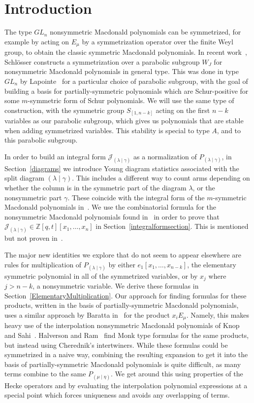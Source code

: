 \documentclass[11pt]{article}
\theoremstyle{definition}
\numberwithin{equation}{section}
\newcommand{\PP}{P_{(\lambda \mid \gamma)}}
\newcommand{\JJ}{\mathcal{J}_{(\lambda \mid \gamma)}}
\newcommand{\nudom}{{( \lambda \mid \gamma )}}
\newcommand{\lambdagamma}{{\nudom}}
\newcommand{\mueta}{{(\mu \mid \eta)}}
\begin{document}
\section{Introduction}
The type $GL_n$ nonsymmetric Macdonald polynomials can be symmetrized, for example by acting on $E_\mu$ by a symmetrization operator over the finite Weyl group, to obtain the classic symmetric Macdonald polynomials. In recent work~\cite{Schlosser}, Schl\"{o}sser constructs a symmetrization over a parabolic subgroup $W_J$ for nonsymmetric Macdonald polynomials in general type. This was done in type $GL_n$ by Lapointe~\cite{Lapointe} for a particular choice of parabolic subgroup, with the goal of building a basis for partially-symmetric polynomials which are Schur-positive for some $m$-symmetric form of Schur polynomials. We will use the same type of construction, with the symmetric group $S_{[1,n-k]}$ acting on the first $n-k$ variables as our parabolic subgroup, which gives us polynomials that are stable when adding symmetrized variables. This stability is special to type $A$, and to this parabolic subgroup.

In order to build an integral form $\JJ$ as a normalization of $\PP$, in Section~\ref{diagrams} we introduce Young diagram statistics associated with the split diagram $\lambdagamma$. This includes a different way to count arms depending on whether the column is in the symmetric part of the diagram $\lambda$, or the nonsymmetric part $\gamma$. These coincide with the integral form of the $m$-symmetric Macdonald polynomials in~\cite{Lapointe}. We use the combinatorial formula for the nonsymmetric Macdonald polynomials found in~\cite{MR2405160} in order to prove that $\JJ \in \mathbb{Z}[q,t][x_1, \dotsc, x_n]$ in Section~\ref{integralformsection}. This is mentioned but not proven in~\cite{Lapointe}.

The major new identities we explore that do not seem to appear elsewhere are rules for multiplication of $\PP$ by either $e_1[x_1, \dotsc, x_{n-k}]$, the elementary symmetric polynomial in all of the symmetrized variables, or by $x_j$ where $j>n-k$, a nonsymmetric variable. We derive these formulas in Section~\ref{ElementaryMultiplication}. Our approach for finding formulas for these products, written in the basis of partially-symmetric Macdonald polynomials, uses a similar approach by Baratta in~\cite{MR2525842} for the product $x_i E_\mu$. Namely, this makes heavy use of the interpolation nonsymmetric Macdonald polynomials of Knop~\cite{MR1456318} and Sahi~\cite{MR1399411}. Halverson and Ram~\cite{MR4756478} find Monk type formulas for the same products, but instead using Cherednik's intertwiners. While these formulas could be symmetrized in a naive way, combining the resulting expansion to get it into the basis of partially-symmetric Macdonald polynomials is quite difficult, as many terms combine to the same $P_{\mueta}$. We get around this using properties of the Hecke operators and by evaluating the interpolation polynomial expressions at a special point which forces uniqueness and avoids any overlapping of terms.
\end{document}
